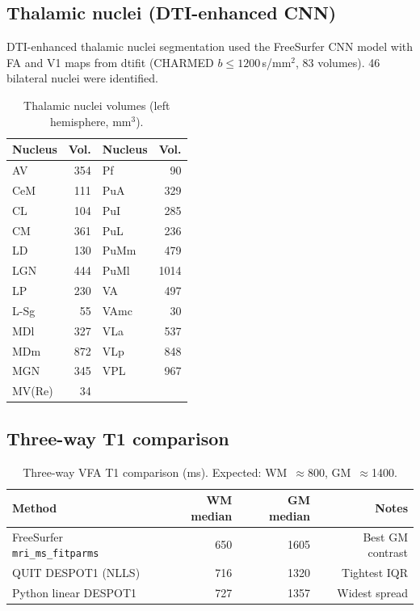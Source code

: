 \documentclass[11pt,a4paper]{article}\usepackage[]{graphicx}\usepackage[]{xcolor}
\begin{document}
\subsection{Thalamic nuclei (DTI-enhanced CNN)}

DTI-enhanced thalamic nuclei segmentation used the FreeSurfer CNN model
with FA and V1 maps from dtifit (CHARMED $b \leq 1200$\,s/mm$^2$, 83
volumes). 46 bilateral nuclei were identified.

\begin{table}[htbp]
\centering
\caption{Thalamic nuclei volumes (left hemisphere, mm$^3$).}
\begin{tabular}{lr|lr}
\toprule
Nucleus & Vol. & Nucleus & Vol. \\
\midrule
AV  &  354 &  Pf  &  90 \\
CeM  &  111 &  PuA  &  329 \\
CL  &  104 &  PuI  &  285 \\
CM  &  361 &  PuL  &  236 \\
LD  &  130 &  PuMm  &  479 \\
LGN  &  444 &  PuMl  &  1014 \\
LP  &  230 &  VA  &  497 \\
L-Sg  &  55 &  VAmc  &  30 \\
MDl  &  327 &  VLa  &  537 \\
MDm  &  872 &  VLp  &  848 \\
MGN  &  345 &  VPL  &  967 \\
MV(Re)  &  34 & &  \\
\bottomrule
\end{tabular}
\end{table}


\subsection{Three-way T1 comparison}

\begin{table}[htbp]
\centering
\caption{Three-way VFA T1 comparison (ms). Expected: WM~$\approx$800, GM~$\approx$1400.}
\begin{tabular}{lrrr}
\toprule
Method & WM median & GM median & Notes \\
\midrule
FreeSurfer \texttt{mri\_ms\_fitparms} & 650 & 1605 & Best GM contrast \\
QUIT DESPOT1 (NLLS)                   & 716 & 1320 & Tightest IQR \\
Python linear DESPOT1                  & 727 & 1357 & Widest spread \\
\bottomrule
\end{tabular}
\end{table}
\end{document}
